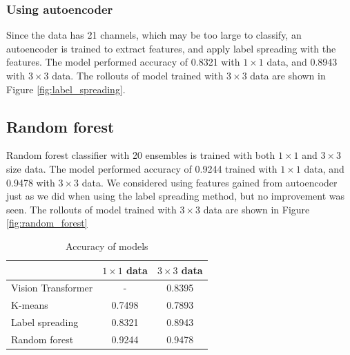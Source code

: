 \documentclass{article}
\begin{document}
        \subsubsection{Using autoencoder}
            Since the data has 21 channels,
            which may be too large to classify,
            an autoencoder is trained to extract features,
            and apply label spreading with the features.
            The model performed accuracy of 0.8321 with $1\times 1$ data,
            and 0.8943 with $3\times 3$ data.
            The rollouts of model trained with $3\times 3$ data
            are shown in Figure \ref{fig:label_spreading}.

    \subsection{Random forest} \label{sec:random}
        Random forest classifier with 20 ensembles is trained with
        both $1\times 1$ and $3\times 3$ size data.
        The model performed accuracy of 0.9244 trained with $1\times 1$ data,
        and 0.9478 with $3\times 3$ data.
        We considered using features gained from autoencoder just as
        we did when using the label spreading method,
        but no improvement was seen.
        The rollouts of model trained with $3\times 3$ data
        are shown in Figure \ref{fig:random_forest}

    \begin{table}
        \centering
        \caption{Accuracy of models}
        \label{tab:accuracy}
        \begin{tabular}{l|cc} \hline
            & $1\times 1$ data & $3\times 3$ data \\ \hline
            Vision Transformer & - & 0.8395 \\
            K-means & 0.7498 & 0.7893 \\
            Label spreading & 0.8321 & 0.8943 \\
            Random forest & 0.9244 & 0.9478 \\ \hline
        \end{tabular}
    \end{table}
\end{document}
